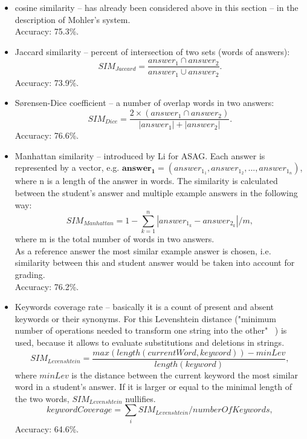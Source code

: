 \documentclass[11pt]{report}
\numberwithin{equation}{section} %
\begin{document}
\begin{itemize}
\item cosine similarity -- has already been considered above in this section -- in the description of Mohler's system. \\
Accuracy: 75.3\%.
\item Jaccard similarity -- percent of intersection of two sets (words of answers):
\begin{equation} \label{eq:Jaccard}
SIM_{Jaccard} = \frac{answer_1 \cap answer_2}{answer_1 \cup answer_2}.
\end{equation}
Accuracy: 73.9\%.
\item S{\o}rensen-Dice coefficient -- a number of overlap words in two answers:
\begin{equation} \label{eq:Dice}
SIM_{Dice} = \frac{2 \times (answer_1 \cap answer_2)}{|answer_1| + |answer_2|}.
\end{equation}
Accuracy: 76.6\%.
\item Manhattan similarity -- introduced by Li for ASAG. Each answer is represented by a vector, e.g. $ \pmb{answer_1} = (answer_{1_1}, answer_{1_2},..., answer_{1_n})$, where n is a length of the answer in words. The similarity is calculated between the student's answer and multiple example answers in the following way:
\begin{equation} \label{eq:Manhattan}
SIM_{Manhattan} = 1 - \sum^n_{k=1}|answer_{1_k} - answer_{2_k}| / m,
\end{equation}
where m is the total number of words in two answers.\\
As a reference answer the most similar example answer is chosen, i.e. similarity between this and student answer would be taken into account for grading.\\
Accuracy: 76.2\%.
\item Keywords coverage rate -- basically it is a count of present and absent keywords or their synonyms. For this Levenshtein distance ("minimum number of operations needed to transform one string into the other" ~\cite{Gomaa}) is used, because it allows to evaluate substitutions and deletions in strings. \\

\begin{equation} \label{eq:Levenshtein}
SIM_{Levenshtein} = \frac{max(length(currentWord,keyword)) - minLev}{length(keyword)},
\end{equation}
where $minLev$ is the distance between the current keyword the most similar word in a student's answer. If it is larger or equal to the minimal length of the two words, $SIM_{Levenshtein}$ nullifies. 
\begin{equation} \label{eq:keywordCover}
keywordCoverage = \sum_{i} SIM_{Levenshtein} / numberOfKeywords,
\end{equation}
Accuracy: 64.6\%.
\end{itemize}
\end{document}

